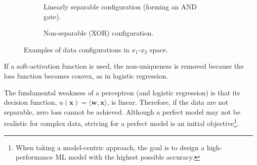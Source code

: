\documentclass[12pt]{article}
\begin{document}
\begin{figure}[ht]
\centering
\begin{subfigure}[b]{0.45\textwidth}
  \centering
  \caption{Linearly separable configuration (forming an AND gate).}
  \label{t05fig04a}
\end{subfigure}
\hfill
\begin{subfigure}[b]{0.45\textwidth}
  \centering
  \caption{Non-separable (XOR) configuration.}
  \label{t05fig04b}
\end{subfigure}
\caption{Examples of data configurations in \(x_1\)-\(x_2\) space.}
\label{t05fig04}
\end{figure}


If a soft-activation function is used, the non-uniqueness is removed because the loss function becomes convex, as in logistic regression.

The fundamental weakness of a perceptron (and logistic regression) is that its decision function, \(u(\bm{x}) = \langle \bm{w}, \bm{x}\rangle\), is linear. Therefore, if the data are not separable, zero loss cannot be achieved. Although a perfect model may not be realistic for complex data, striving for a perfect model is an initial objective\footnote{When taking a model-centric approach, the goal is to design a high-performance ML model with the highest possible accuracy.}.
\end{document}
